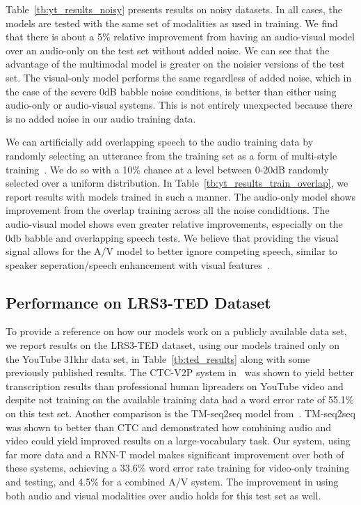 \documentclass{article}
\newcommand{\lrsted}{\textsc{LRS3-TED}\xspace}
\newcommand{\negsectionspace}{\vspace{-4pt}}
\begin{document}
Table~\ref{tb:yt_results_noisy} presents results on noisy datasets. In
all cases, the models are tested with the same set of modalities as
used in training. We find that there is about a 5\% relative
improvement from having an audio-visual model over an audio-only on
the \ytdev test set without added noise. We can see that the advantage
of the multimodal model is greater on the noisier versions of the test
set. The visual-only model performs the same regardless of added
noise, which in the case of the severe 0dB babble noise conditions, is
better than either using audio-only or audio-visual systems. This is
not entirely unexpected because there is no added noise in our audio
training data.

We can artificially add overlapping speech to the audio training data
by randomly selecting an utterance from the training set as a form of
multi-style training~\cite{lippmann87multistyle}. We do so with a 10\%
chance at a level between 0-20dB randomly selected over a uniform
distribution. In Table~\ref{tb:yt_results_train_overlap}, we report
results with models trained in such a manner. The audio-only model
shows improvement from the overlap training across all the noise
condidtions. The audio-visual model shows even greater relative improvements,
especially on the 0db babble and overlapping speech tests. We believe that
providing the visual signal allows for the A/V model to
better ignore competing speech, similar to speaker seperation/speech enhancement with visual
features~\cite{l2l18acm,afouras18avenhance}.











\negsectionspace
\subsection{Performance on \lrsted Dataset}
\label{ted_results}
\negsectionspace
To provide a reference on how our models work on a publicly available
data set, we report results on the \lrsted dataset, using our models
trained only on the YouTube 31khr data set, in
Table~\ref{tb:ted_results} along with some previously published
results. The CTC-V2P system in~\citet{dm_lsvsr_2018} was shown to
yield better transcription results than professional human lipreaders
on YouTube video and despite not training on the available training
data had a word error rate of 55.1\% on this test set. Another
comparison is the TM-seq2seq model
from~\citet{ox_davsr_2018}. TM-seq2seq was shown to better than CTC
and demonstrated how combining audio and video could yield improved
results on a large-vocabulary task. Our system, using far more data
and a RNN-T model makes significant improvement over both of these
systems, achieving a 33.6\% word error rate training for video-only
training and testing, and 4.5\% for a combined A/V system. The
improvement in using both audio and visual modalities over audio holds
for this test set as well.
\end{document}
